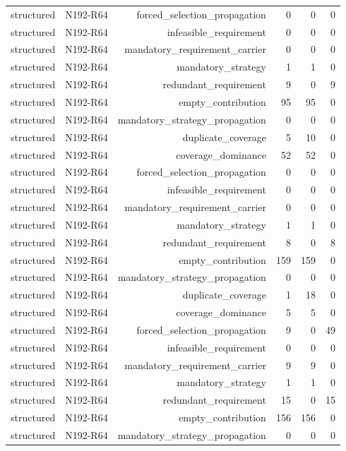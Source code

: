 {\begin{longtable}{lrrrrr}
structured & N192-R64 & forced\_selection\_propagation & 0 & 0 & 0 \\
structured & N192-R64 & infeasible\_requirement & 0 & 0 & 0 \\
structured & N192-R64 & mandatory\_requirement\_carrier & 0 & 0 & 0 \\
structured & N192-R64 & mandatory\_strategy & 1 & 1 & 0 \\
structured & N192-R64 & redundant\_requirement & 9 & 0 & 9 \\
structured & N192-R64 & empty\_contribution & 95 & 95 & 0 \\
structured & N192-R64 & mandatory\_strategy\_propagation & 0 & 0 & 0 \\
structured & N192-R64 & duplicate\_coverage & 5 & 10 & 0 \\
structured & N192-R64 & coverage\_dominance & 52 & 52 & 0 \\
structured & N192-R64 & forced\_selection\_propagation & 0 & 0 & 0 \\
structured & N192-R64 & infeasible\_requirement & 0 & 0 & 0 \\
structured & N192-R64 & mandatory\_requirement\_carrier & 0 & 0 & 0 \\
structured & N192-R64 & mandatory\_strategy & 1 & 1 & 0 \\
structured & N192-R64 & redundant\_requirement & 8 & 0 & 8 \\
structured & N192-R64 & empty\_contribution & 159 & 159 & 0 \\
structured & N192-R64 & mandatory\_strategy\_propagation & 0 & 0 & 0 \\
structured & N192-R64 & duplicate\_coverage & 1 & 18 & 0 \\
structured & N192-R64 & coverage\_dominance & 5 & 5 & 0 \\
structured & N192-R64 & forced\_selection\_propagation & 9 & 0 & 49 \\
structured & N192-R64 & infeasible\_requirement & 0 & 0 & 0 \\
structured & N192-R64 & mandatory\_requirement\_carrier & 9 & 9 & 0 \\
structured & N192-R64 & mandatory\_strategy & 1 & 1 & 0 \\
structured & N192-R64 & redundant\_requirement & 15 & 0 & 15 \\
structured & N192-R64 & empty\_contribution & 156 & 156 & 0 \\
structured & N192-R64 & mandatory\_strategy\_propagation & 0 & 0 & 0 \\

\end{longtable}}
